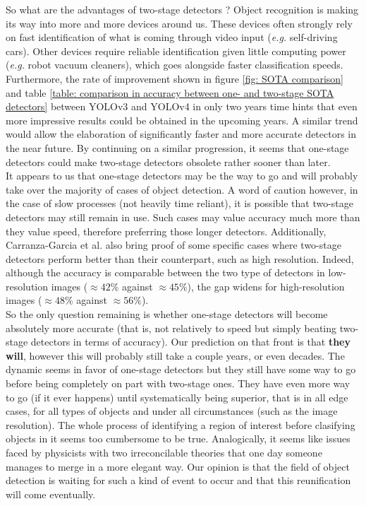 \documentclass[runningheads]{llncs}
\begin{document}
So what are the advantages of two-stage detectors ? Object recognition is making its way into more and more devices around us. These devices often strongly rely on fast identification of what is coming through video input (\textit{e.g.} self-driving cars). Other devices require reliable identification given little computing power (\textit{e.g.} robot vacuum cleaners), which goes alongside faster classification speeds. \\
Furthermore, the rate of improvement shown in figure \ref{fig: SOTA comparison} and table \ref{table: comparison in accuracy between one- and two-stage SOTA detectors} between YOLOv3 and YOLOv4 in only two years time hints that even more impressive results could be obtained in the upcoming years. A similar trend would allow the elaboration of significantly faster and more accurate detectors in the near future. By continuing on a similar progression, it seems that one-stage detectors could make two-stage detectors obsolete rather sooner than later. \\
It appears to us that one-stage detectors may be the way to go and will probably take over the majority of cases of object detection. A word of caution however, in the case of slow processes (not heavily time reliant), it is possible that two-stage detectors may still remain in use. Such cases may value accuracy much more than they value speed, therefore preferring those longer detectors. Additionally, Carranza-Garcia et al. \cite{carranza-garcia_performance_2020} also bring proof of some specific cases where two-stage detectors perform better than their counterpart, such as high resolution. Indeed, although the accuracy is comparable between the two type of detectors in low-resolution images ($\approx 42\%$ against $\approx 45\%$), the gap widens for high-resolution images ($\approx 48\%$ against $\approx 56\%$). \\
So the only question remaining is whether one-stage detectors will become absolutely more accurate (that is, not relatively to speed but simply beating two-stage detectors in terms of accuracy). Our prediction on that front is that \textbf{they will}, however this will probably still take a couple years, or even decades. The dynamic seems in favor of one-stage detectors but they still have some way to go before being completely on part with two-stage ones. They have even more way to go (if it ever happens) until systematically being superior, that is in all edge cases, for all types of objects and under all circumstances (such as the image resolution). The whole process of identifying a region of interest before clasifying objects in it seems too cumbersome to be true. Analogically, it seems like issues faced by physicists with two irreconcilable theories that one day someone manages to merge in a more elegant way. Our opinion is that the field of object detection is waiting for such a kind of event to occur and that this reunification will come eventually.



\end{document}
